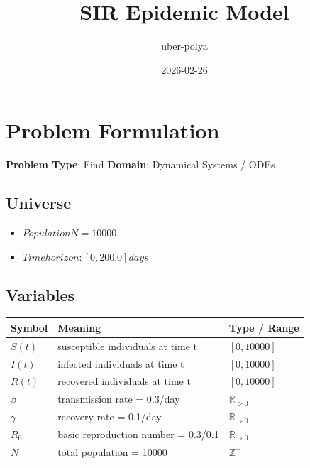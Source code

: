 \documentclass[11pt, a4paper]{article}
\title{SIR Epidemic Model}
\author{uber-polya}
\date{2026-02-26}
\begin{document}
\maketitle
\tableofcontents
\newpage

\section{Problem Formulation}

\begin{polyamodel}

\textbf{Problem Type}: Find \hfill
\textbf{Domain}: Dynamical Systems / ODEs


\end{polyamodel}

\subsection{Universe}

\begin{itemize}
  \item $Population N = 10000$
  \item $Time horizon: [0, 200.0] days$
\end{itemize}

\subsection{Variables}

\begin{longtable}{lll}
\toprule
\textbf{Symbol} & \textbf{Meaning} & \textbf{Type / Range} \\
\midrule
\endhead
$S(t)$ & susceptible individuals at time t & $[0, 10000]$ \\
$I(t)$ & infected individuals at time t & $[0, 10000]$ \\
$R(t)$ & recovered individuals at time t & $[0, 10000]$ \\
$\beta$ & transmission rate = 0.3/day & $\mathbb{{R}}_{{>0}}$ \\
$\gamma$ & recovery rate = 0.1/day & $\mathbb{{R}}_{{>0}}$ \\
$R_0$ & basic reproduction number = 0.3/0.1 & $\mathbb{{R}}_{{>0}}$ \\
$N$ & total population = 10000 & $\mathbb{{Z}}^+$ \\
\bottomrule
\end{longtable}
\end{document}
